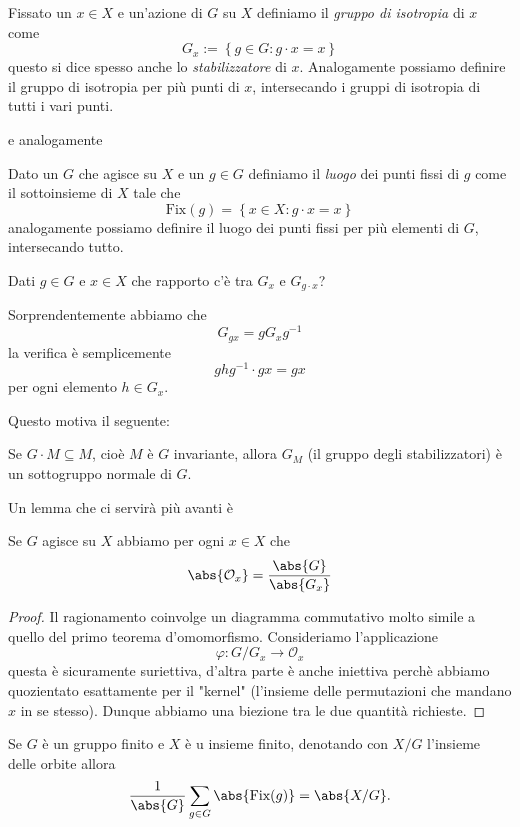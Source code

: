 \documentclass[11pt]{scrartcl}
\begin{document}
	\begin{definition}
		Fissato un $x\in X$ e un'azione di $G$ su $X$ definiamo il \textit{gruppo di isotropia} di $x$ come
		$$G_x:=\left\{g\in G:g\cdot x = x\right\}$$
		questo si dice spesso anche lo \textit{stabilizzatore} di $x$. Analogamente possiamo definire il gruppo di isotropia per più punti di $x$, intersecando i gruppi di isotropia di tutti i vari punti.
	\end{definition}
	e analogamente
	\begin{definition}
		Dato un $G$ che agisce su $X$ e un $g\in G$ definiamo il \textit{luogo} dei punti fissi di $g$ come il sottoinsieme di $X$ tale che
		$$\text{Fix}(g)=\left\{x\in X:g\cdot x=x\right\}$$
		analogamente possiamo definire il luogo dei punti fissi per più elementi di $G$, intersecando tutto.
	\end{definition}
	\begin{problem}
		Dati $g\in G$ e $x\in X$ che rapporto c'è tra 
		$G_x$ e $G_{g\cdot x}$?
	\end{problem}
	\begin{answer}
		Sorprendentemente abbiamo che
		$$G_{gx}=gG_xg^{-1}$$
		la verifica è semplicemente 
		$$ghg^{-1}\cdot gx=gx$$
		per ogni elemento $h\in G_x$.
	\end{answer}
	Questo motiva il seguente:
	\begin{lemma}
		Se $G\cdot M\subseteq M$, cioè $M$ è $G$ invariante, allora $G_M$ (il gruppo degli stabilizzatori) è un sottogruppo normale di $G$.
	\end{lemma}
	Un lemma che ci servirà più avanti è
	\begin{lemma}
		Se $G$ agisce su $X$ abbiamo per ogni $x\in X$ che
		$$\abs{\mathcal{O}_x}=\frac{\abs{G}}{\abs{G_x}}$$
	\end{lemma}
	\begin{proof}
		Il ragionamento coinvolge un diagramma commutativo molto simile a quello del primo teorema d'omomorfismo. Consideriamo l'applicazione
		$$\varphi:G/G_x \to \mathcal{O}_x$$
		questa è sicuramente suriettiva, d'altra parte è anche iniettiva perchè abbiamo quozientato esattamente per il "kernel" (l'insieme delle permutazioni che mandano $x$ in se stesso). Dunque abbiamo una biezione tra le due quantità richieste.
	\end{proof}
	\begin{lemma}[Burnside]
		Se $G$ è un gruppo finito e $X$ è u insieme finito, denotando con $X/G$ l'insieme delle orbite allora
		$$\frac{1}{\abs{G}}\sum_{g\in G}\abs{\text{Fix}(g)}=\abs{X/G}.$$
	\end{lemma}
\end{document}
